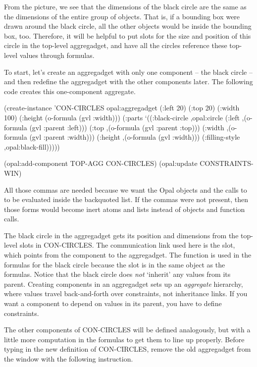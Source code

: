 From the picture, we see that the dimensions of the black circle are
the same as the dimensions of the entire group of objects.  That is,
if a bounding box were drawn around the black circle, all the other
objects would be inside the bounding box, too.
Therefore, it will be helpful to put slots for the size and position
of this circle in the top-level aggregadget, and have all the circles
reference these top-level values through formulas.

To start, let's create an aggregadget with only one component -- the
black circle -- and then redefine the aggregadget with the other
components later.  The following code creates this one-component
aggregate.

\begin{programexample}
(create-instance 'CON-CIRCLES opal:aggregadget
   (:left 20) (:top 20)
   (:width 100)
   (:height (o-formula (gvl :width)))
   (:parts
    `((:black-circle ,opal:circle
                     (:left ,(o-formula (gvl :parent :left)))
                     (:top ,(o-formula (gvl :parent :top)))
                     (:width ,(o-formula (gvl :parent :width)))
                     (:height ,(o-formula (gvl :width)))
                     (:filling-style ,opal:black-fill)))))

(opal:add-component TOP-AGG CON-CIRCLES)
(opal:update CONSTRAINTS-WIN)
\end{programexample}

All those commas are needed because we want the Opal objects and the
calls to  to be evaluated inside the backquoted list.
If the commas were not present, then those forms would become inert
atoms and lists instead of objects and function calls.

The black circle in the aggregadget gets its position and
dimensions from the top-level slots in CON-CIRCLES.  The communication
link used here is the  slot, which points from the
component to the aggregadget.  The function
 is used in the formulas for the black circle because the
 slot is in the same object as the formulas.  Notice that
the black circle does {\it not} `inherit' any values from its parent.
Creating components in an aggregadget sets up an {\it aggregate}
hierarchy, where values travel back-and-forth over constraints,
not inheritance links.  If you want a component to depend on values in
its parent, you have to define constraints.

The other components of CON-CIRCLES will be defined analogously, but with
a little more computation in the formulas to get them to line up properly.
Before typing in the new definition of CON-CIRCLES, remove the old
aggregadget from the window with the following instruction.

